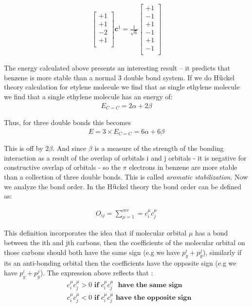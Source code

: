 \documentclass[9pt,twocolumn,twoside]{optica}
\begin{document}
\begin{align}
\begin{bmatrix}
    +1\\
    +1\\
    -2\\
    +1\\   
\end{bmatrix}
\textbf{c}^1=\frac{1}{\sqrt{6}}
\begin{bmatrix}
    +1\\
    -1\\
    +1\\
    -1\\
    +1\\
    -1\\   
\end{bmatrix}
 \label{eq:pHmat}
\end{align}



The energy calculated above presents an interesting result -- it predicts that benzene is more stable than a normal 3 double bond system. If we do  H$\ddot{\text u}$ckel theory calculation for etylene molecule we find that as single ethylene molecule we find that a single ethylene molecule has an energy of:
\begin{align}
E_{C=C}=2\alpha+2\beta
 \label{eq:ethy}
\end{align}

Thus, for three double bonds this becomes 
\begin{align}
E= 3 \times E_{C=C}=6\alpha+6\beta
 \label{eq:sta}
 \end{align}

This is off by $2\beta$. And since $\beta$  is a measure of the strength of the bonding interaction as a result of the overlap of orbitals i and j orbitals - it is negative for constructive overlap of orbitals - so the $\pi$ electrons in benzene are more stable than a collection of three double bonds. This is called \textit{aromatic stabilization}. 
Now we analyze the bond order. In the  H$\ddot{\text u}$ckel theory the bond order can be defined as:

\begin{align}
O_{ij} =\sum_{\mu=1}^{occ}=c_i^\mu c_j^\mu 
 \label{eq:bond1}
 \end{align}

This definition incorporates the idea that if molecular orbital $\mu$ has a bond between the ith and jth carbons, then the coefficients of the molecular orbital on those carbons should both have the same sign (e.g we have $p_y^{i}+p_y^{j}$), similarly if its an anti-bonding orbital then the coefficients have the opposite sign  (e.g we have $p_y^{i}+p_y^{j}$). The expression above reflects that :
\begin{align}
& c_i^\mu c_j^\mu >0 \, \, \textbf{if} \, \, c_i^\mu c_j^\mu  \,\,\textbf{ have the same sign} \\
& c_i^\mu c_j^\mu <0 \, \, \textbf{if}  \, \,c_i^\mu c_j^\mu  \,\, \textbf{have the opposite sign}
 \label{eq:bond2}
 \end{align} 
 
\end{document}
